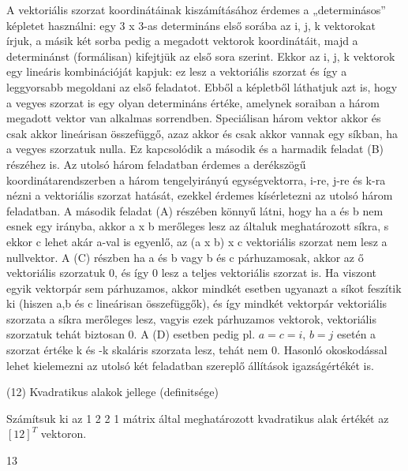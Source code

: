 \begin{frame}
  \begin{tcolorbox}[title={11/1. {\symknight}}]
    A vektoriális szorzat koordinátáinak kiszámításához érdemes a „determinásos” képletet használni: egy 3 x 3-as determináns első sorába az i, j, k vektorokat írjuk, a másik két sorba pedig a megadott vektorok koordinátáit, majd a determinánst (formálisan) kifejtjük az első sora szerint. Ekkor az i, j, k vektorok egy lineáris kombinációját kapjuk: ez lesz a vektoriális szorzat és így a leggyorsabb megoldani az első feladatot. Ebből a képletből láthatjuk azt is, hogy a vegyes szorzat is egy olyan determináns értéke, amelynek soraiban a három megadott vektor van alkalmas sorrendben. Speciálisan három vektor akkor és csak akkor lineárisan összefüggő, azaz akkor és csak akkor vannak egy síkban, ha a vegyes szorzatuk nulla. Ez kapcsolódik a második és a harmadik feladat (B) részéhez is. Az utolsó három feladatban érdemes a derékszögű koordinátarendszerben a három tengelyirányú egységvektorra, i-re, j-re és k-ra nézni a vektoriális szorzat hatását, ezekkel érdemes kísérletezni az utolsó három feladatban. A második feladat (A) részében könnyű látni, hogy ha a és b nem esnek egy irányba, akkor a x b merőleges lesz az általuk meghatározott síkra, s ekkor c lehet akár a-val is egyenlő, az (a x b) x c vektoriális szorzat nem lesz a nullvektor. A (C) részben ha a és b vagy b és c párhuzamosak, akkor az ő vektoriális szorzatuk 0, és így 0 lesz a teljes vektoriális szorzat is. Ha viszont egyik vektorpár sem párhuzamos, akkor mindkét esetben ugyanazt a síkot feszítik ki (hiszen a,b és c lineárisan összefüggők), és így mindkét vektorpár vektoriális szorzata a síkra merőleges lesz, vagyis ezek párhuzamos vektorok, vektoriális szorzatuk tehát biztosan 0. A (D) esetben pedig pl. $a = c = i$, $b = j$ esetén a szorzat értéke k és -k skaláris szorzata lesz, tehát nem 0. Hasonló okoskodással lehet kielemezni az utolsó két feladatban szereplő állítások igazságértékét is.
  \end{tcolorbox}
\end{frame}


\begin{frame}[plain]
\begin{tcolorbox}[center, colback={myyellow}, coltext={black}, colframe={myyellow}]
    {\RHuge  (12) Kvadratikus alakok jellege (definitsége)}
    \mmedskip
\end{tcolorbox}
\end{frame}

\begin{frame}
  \begin{tcolorbox}[title={12/1. {\symknight}}]
     Számítsuk ki az 1 2 2 1 mátrix által meghatározott kvadratikus alak értékét az $[1 2]^T$ vektoron.

  \tcblower

    \mmedskip 
    
    13
  \end{tcolorbox}
\end{frame}


